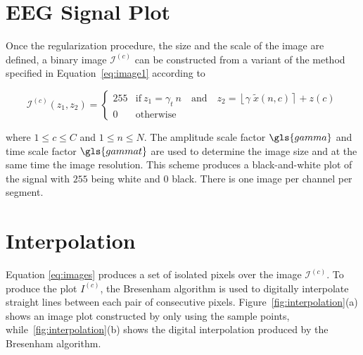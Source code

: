 \section{EEG Signal Plot}
\label{Plot}

Once the regularization procedure,  the size and the scale of the image are defined,  a binary image $\mathcal{I}^{(c)}$ can be constructed from a variant of the method specified in Equation~\ref{eq:image1} according to

\begin{equation}
\mathcal{I}^{(c)}(z_1,z_2) = \left\{ \begin{array}{rl}
255 & \text{if} \   z_1 = \gamma_{t} \  n \quad \text{and}  \quad z_2 = \left\lfloor \gamma \; \tilde{x}(n,c) \right\rceil + z(c) \\
0   & \mbox{otherwise}
\end{array}\right.
\label{eq:images}
\end{equation}

\noindent  where  $1 \leq c \leq C$ and $1 \leq n \leq N$. The amplitude scale factor $\gls{gamma}$ and time scale factor $\gls{gammat}$ are used to determine the image size and at the same time the image resolution. This scheme produces a black-and-white plot of the signal with $255$ being white and $0$ black.  There is one image per channel per segment. 


\section{Interpolation}

Equation \ref{eq:images} produces a set of isolated pixels over the image $\mathcal{I}^{(c)}$.  To produce the plot $I^{(c)}$, the Bresenham \cite{Bresenham1965,Ramele2016} algorithm is used to digitally interpolate straight lines between each pair of consecutive pixels.  Figure~\ref{fig:interpolation}(a) shows an image plot constructed by only using the sample points, while~\ref{fig:interpolation}(b) shows the digital interpolation produced by the Bresenham algorithm.

